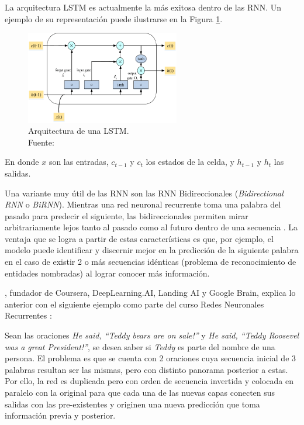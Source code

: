 \begin{itemize}
\begin{itemize}
		La arquitectura LSTM es actualmente la más exitosa dentro de las RNN. Un ejemplo de su representación puede ilustrarse en la Figura \ref{2:fig42}.
		
		\begin{figure}[!ht]
			\begin{center}
				\includegraphics[width=0.6\textwidth]{2/figures/lstm.png}
				\caption[Arquitectura de una LSTM]{Arquitectura de una LSTM.\\
				Fuente: \cite{tec_yuan2019lstm}}
				\label{2:fig42}
			\end{center}
		\end{figure}
	
		En donde $x$ son las entradas, $c_{t-1}$ y $c_{t}$ los estados de la celda, y $h_{t-1}$ y $h_{t}$  las salidas.
		
		Una variante muy útil de las RNN son las RNN Bidireccionales (\textit{Bidirectional RNN} o \textit{BiRNN}). Mientras una red neuronal recurrente toma una palabra del pasado para predecir el siguiente, las bidireccionales permiten mirar arbitrariamente lejos tanto al pasado como al futuro dentro de una secuencia \parencite{bk_goldberg2017nn_nlp}.
		La ventaja que se logra a partir de estas características es que, por ejemplo, el modelo puede identificar y discernir mejor en la predicción de la siguiente palabra en el caso de existir 2 o más secuencias idénticas (problema de reconocimiento de entidades nombradas) al lograr conocer más información.
		
		\citeauthor{tec_ng2018bidirectionalRNN}, fundador de Coursera, DeepLearning.AI, Landing AI y Google Brain, explica lo anterior con el siguiente ejemplo como parte del curso Redes Neuronales Recurrentes \parencite{tec_ng2018bidirectionalRNN}:
		
		Sean las oraciones \textit{He said, “Teddy bears are on sale!”} y \textit{He said, “Teddy Roosevel was a great President!”}, se desea saber si \textit{Teddy} es parte del nombre de una persona. El problema es que se cuenta con 2 oraciones cuya secuencia inicial de 3 palabras resultan ser las mismas, pero con distinto panorama posterior a estas. Por ello, la red es duplicada pero con orden de secuencia invertida y colocada en paralelo con la original para que cada una de las nuevas capas conecten sus salidas con las pre-existentes y originen una nueva predicción que toma información previa y posterior.
		

\end{itemize}
\end{itemize}
